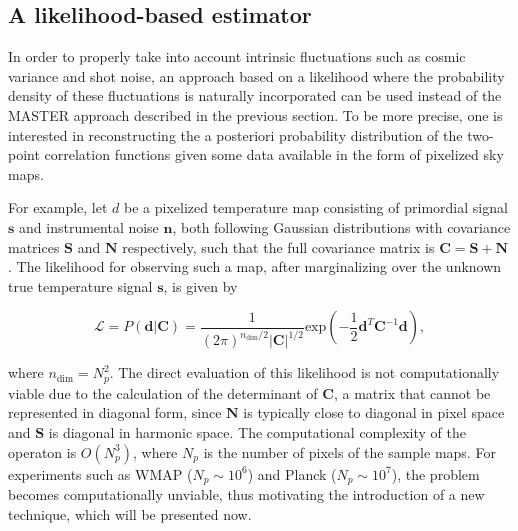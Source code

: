 \documentclass[openany,a4paper,12pt,oneside]{book}
\begin{document}
\begin{spacing}{1.5}


\section{A likelihood-based estimator}

In order to properly take into account intrinsic fluctuations such as cosmic variance and shot noise, an approach based on a likelihood where the probability density of these fluctuations is naturally incorporated can be used instead of the MASTER approach described in the previous section. To be more precise, one is interested in reconstructing the a posteriori probability distribution of the two-point correlation functions given some data available in the form of pixelized sky maps.


For example, let $d$ be a pixelized temperature map consisting of primordial signal $\mathbf{s}$ and instrumental noise $\mathbf{n}$, both following Gaussian distributions with covariance matrices $\mathbf{S}$ and $\mathbf{N}$ respectively, such that the full covariance matrix is $\mathbf{C}=\mathbf{S}+\mathbf{N}$. The likelihood for observing such a map, after marginalizing over the unknown true temperature signal $\mathbf{s}$, is given by

\begin{equation}\label{ch4:Likelihood}
	\mathcal{L}=P(\mathbf{d}|\mathbf{C})=\frac{1}{(2\pi)^{n_\text{dim}/2}|\mathbf{C}|^{1/2}}\text{exp}\left(-\frac{1}{2}\mathbf{d}^T \mathbf{C}^{-1} \mathbf{d}\right),
\end{equation}

\noindent where $n_\text{dim}=N_p^2$. The direct evaluation of this likelihood is not computationally viable due to the calculation of the determinant of $\mathbf{C}$, a matrix that cannot be represented in diagonal form, since $\mathbf{N}$ is typically close to diagonal in pixel space and $\mathbf{S}$ is diagonal in harmonic space. The computational complexity of the operaton is $O(N_p^3)$, where $N_p$ is the number of pixels of the sample maps. For experiments such as WMAP ($N_p\sim 10^6$) and Planck ($N_p \sim 10^7$), the problem becomes computationally unviable, thus motivating the introduction of a new technique, which will be presented now.


\end{spacing}
\end{document}

